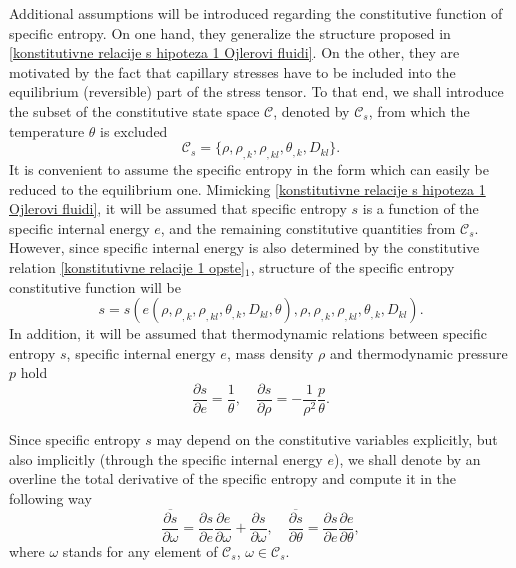 \documentclass[a4paper,fleqn]{cas-sc}
\theoremstyle{definition}
\begin{document}
Additional assumptions will be introduced regarding the constitutive function of specific entropy. On one hand, they generalize the structure proposed in \eqref{konstitutivne relacije s hipoteza 1 Ojlerovi fluidi}. On the other, they are motivated by the fact that capillary stresses have to be included into the equilibrium (reversible) part of the stress tensor. To that end, we shall introduce the subset of the constitutive state space $\mathcal{C}$, denoted by $\mathcal{C}_{s}$, from which the temperature $\theta$ is excluded 
\begin{equation} \label{CSS-subset_Korteweg}
	\mathcal{C}_{s} = \{ \rho, \rho_{,k}, \rho_{,kl}, \theta_{,k}, D_{kl} \}.   
\end{equation}
It is convenient to assume the specific entropy in the form which can easily be reduced to the equilibrium one. Mimicking \eqref{konstitutivne relacije s hipoteza 1 Ojlerovi fluidi}, it will be assumed that specific entropy $s$ is a function of the specific internal energy $e$, and the remaining constitutive quantities from $\mathcal{C}_{s}$. However, since specific internal energy is also determined by the constitutive relation \eqref{konstitutivne relacije 1 opste}$_{1}$, structure of the specific entropy constitutive function will be
\begin{equation} \label{konstitutivne relacije s hipoteza 1}
	s = s(e(\rho, \rho_{,k}, \rho_{,kl}, \theta_{,k}, D_{kl}, \theta), 
	\rho, \rho_{,k}, \rho_{,kl}, \theta_{,k}, D_{kl}). 
\end{equation} 
In addition, it will be assumed that thermodynamic relations between specific entropy $s$, specific internal energy $e$, mass density $\rho$ and thermodynamic pressure $p$ hold
\begin{equation} \label{konstitutivne relacije s hipoteza 2}
	\dfrac{\partial s}{\partial e} = \dfrac{1}{\theta}, \quad 
	\dfrac{\partial s}{\partial \rho} = - \dfrac{1}{\rho^{2}} \dfrac{p}{\theta}.
\end{equation}

Since specific entropy $s$ may depend on the constitutive variables explicitly, but also implicitly (through the specific internal energy $e$), we shall denote by an overline the total derivative of the specific entropy and compute it in the following way
\begin{equation} \label{totalni izvod}
	\overline{\dfrac{\partial s}{\partial\omega}} 
	= \dfrac{\partial s}{\partial e}\dfrac{\partial e}{\partial\omega} 
	+ \dfrac{\partial s}{\partial\omega}, \quad
	\overline{\dfrac{\partial s}{\partial \theta}} 
	= \dfrac{\partial s}{\partial e}\dfrac{\partial e}{\partial \theta},  
\end{equation}
where $\omega$ stands for any element of $\mathcal{C}_{s}$, $\omega \in \mathcal{C}_{s}$. 
\end{document}
